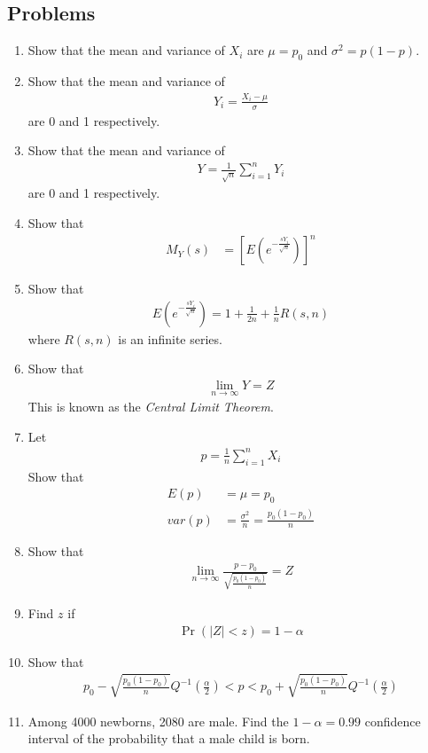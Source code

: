 \documentclass[journal,12pt,onecolumn]{IEEEtran}
\renewcommand\thesection{\arabic{section}}
\renewcommand\thesubsection{\thesection.\arabic{subsection}}
\providecommand{\pr}[1]{\ensuremath{\Pr\left(#1\right)}}
\providecommand{\sbrak}[1]{\ensuremath{{}\left[#1\right]}}
\providecommand{\brak}[1]{\ensuremath{\left(#1\right)}}
\theoremstyle{remark}
\providecommand{\abs}[1]{\left\vert#1\right\vert}
\numberwithin{equation}{section}
\begin{document}
 \subsection{Problems}
\begin{enumerate}[label=\arabic*.,ref=\thesubsection.\theenumi]
\item Show that the mean and variance of $X_i$ are $\mu = p_0$ and $\sigma^2 = p \brak{1-p}$. 
\item Show that the mean and variance of 
\begin{align}
	Y_i = \frac{X_i - \mu}{\sigma}
\end{align}
are 0 and 1 respectively.
\item Show that the mean and variance of 
\begin{align}
	Y = \frac{1}{\sqrt{n}}\sum_{i=1}^{n}Y_i
\end{align}
are 0 and 1 respectively.
\item Show that
\begin{align}
	M_Y(s) &= \sbrak{E\brak{e^{-\frac{sY_i}{\sqrt{n}}}}}^n
\end{align}
\item Show that 
\begin{align}
	E\brak{e^{-\frac{sY_i}{\sqrt{n}}}} = 1 + \frac{1}{2n}+ \frac{1}{n}R(s,n)
\end{align}
		where $R(s,n)$ is an infinite series.
	\item Show that 
\begin{align}
	\lim_{n \to \infty} Y = Z
\end{align}
		This is known as the {\em Central Limit Theorem}.
	\item Let
		\begin{align}
	p = \frac{1}{n}\sum_{i=1}^{n}X_i
\end{align}
Show that 
		\begin{align}
			E\brak{p} &= \mu = p_0
			\\
			var\brak{p} &= \frac{\sigma^2}{n} = \frac{p_0\brak{1-p_0}}{n}
\end{align}
\item Show that 
\begin{align}
	\lim_{n \to \infty} \frac{p-p_0}{\sqrt{\frac{p_0\brak{1-p_0}}{n}}} = Z
\end{align}
\item Find $z$ if 
\begin{align}
	\pr{\abs{Z} < z} = 1-\alpha
\end{align}
\item Show that 
\begin{align}
	p_0 - \sqrt{\frac{p_0\brak{1-p_0}}{n}}Q^{-1}\brak{\frac{\alpha}{2}}
	< p <
	p_0 + \sqrt{\frac{p_0\brak{1-p_0}}{n}}Q^{-1}\brak{\frac{\alpha}{2}}
\end{align}
\item Among 4000 newborns, 2080 are male.  Find the $1 -\alpha = 0.99$ confidence interval of the probability that a male child is born.
 \end{enumerate}
\end{document}
